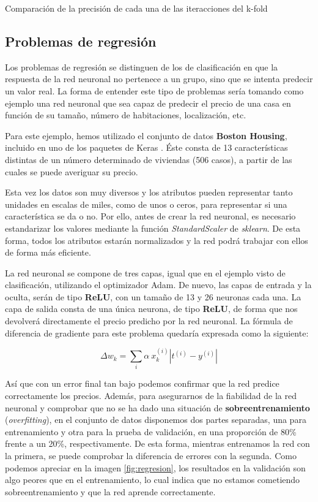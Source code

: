 %
       {Comparación de la precisión de cada una de las iteracciones del k-fold}

\subsection{Problemas de regresión}
\label{sec:regres_NN}
Los problemas de regresión se distinguen de los de clasificación en que la respuesta de la red neuronal no pertenece a un grupo, sino que se intenta predecir un valor real. La forma de entender este tipo de problemas sería tomando como ejemplo una red neuronal que sea capaz de predecir el precio de una casa en función de su tamaño, número de habitaciones, localización, etc.

Para este ejemplo, hemos utilizado el conjunto de datos \textbf{Boston Housing}, incluido en uno de los paquetes de Keras \citep{BostonKeras}. Éste consta de 13 características distintas de un número determinado de viviendas (506 casos), a partir de las cuales se puede averiguar su precio. 

Esta vez los datos son muy diversos y los atributos pueden representar tanto unidades en escalas de miles, como de unos o ceros, para representar si una característica se da o no. Por ello, antes de crear la red neuronal, es necesario estandarizar los valores mediante la función \textit{StandardScaler} de \textit{sklearn}. De esta forma, todos los atributos estarán normalizados y la red podrá trabajar con ellos de forma más eficiente.

La red neuronal se compone de tres capas, igual que en el ejemplo visto de clasificación, utilizando el optimizador Adam. De nuevo, las capas de entrada y la oculta, serán de tipo \textbf{ReLU}, con un tamaño de 13 y 26 neuronas cada una. La capa de salida consta de una única neurona, de tipo \textbf{ReLU}, de forma que nos devolverá directamente el precio predicho por la red neuronal. La fórmula de diferencia de gradiente para este problema quedaría expresada como la siguiente:

$$\Delta w_{k} = \sum_{i} \alpha\ x_{k}^{(i)} |t^{(i)} - y^{(i)} |$$

Así que con un error final tan bajo podemos confirmar que la red predice correctamente los precios. Además, para asegurarnos de la fiabilidad de la red neuronal y comprobar que no se ha dado una situación de \textbf{sobreentrenamiento} (\textit{overfitting}), en el conjunto de datos disponemos dos partes separadas, una para entrenamiento y otra para la prueba de validación, en una proporción de 80\% frente a un 20\%, respectivamente. De esta forma, mientras entrenamos la red con la primera, se puede comprobar la diferencia de errores con la segunda. Como podemos apreciar en la imagen \ref{fig:regresion}, los resultados en la validación son algo peores que en el entrenamiento, lo cual indica que no estamos cometiendo sobreentrenamiento y que la red aprende correctamente.

